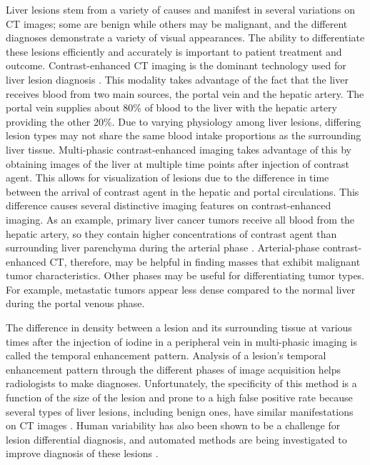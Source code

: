Liver lesions stem from a variety of causes and manifest in several variations on CT images; some are benign while others may be malignant, and the different diagnoses demonstrate a variety of visual appearances. The ability to differentiate these lesions efficiently and accurately is important to patient treatment and outcome. Contrast-enhanced CT imaging is the dominant technology used for liver lesion diagnosis \cite{Baron:1994vg}. This modality takes advantage of the fact that the liver receives blood from two main sources, the portal vein and the hepatic artery. The portal vein supplies about 80\% of blood to the liver with the hepatic artery providing the other 20\%. Due to varying physiology among liver lesions, differing lesion types may not share the same blood intake proportions as the surrounding liver tissue. Multi-phasic contrast-enhanced imaging takes advantage of this by obtaining images of the liver at multiple time points after injection of contrast agent. This allows for visualization of lesions due to the difference in time between the arrival of contrast agent in the hepatic and portal circulations. This difference causes several distinctive imaging features on contrast-enhanced imaging. As an example, primary liver cancer tumors receive all blood from the hepatic artery, so they contain higher concentrations of contrast agent than surrounding liver parenchyma during the arterial phase \cite{Lautt:1987wma,Matsui:1991vba}. Arterial-phase contrast-enhanced CT, therefore, may be helpful in finding masses that exhibit malignant tumor characteristics. Other phases may be useful for differentiating tumor types. For example, metastatic tumors appear less dense compared to the normal liver during the portal venous phase.

The difference in density between a lesion and its surrounding tissue at various times after the injection of iodine in a peripheral vein in multi-phasic imaging is called the temporal enhancement pattern. Analysis of a lesion's temporal enhancement pattern through the different phases of image acquisition helps radiologists to make diagnoses. Unfortunately, the specificity of this method is a function of the size of the lesion and prone to a high false positive rate because several types of liver lesions, including benign ones, have similar manifestations on CT images \cite{Lencioni:2005ia}. Human variability has also been shown to be a challenge for lesion differential diagnosis, and automated methods are being investigated to improve diagnosis of these lesions \cite{Armato:2007ks}. 
